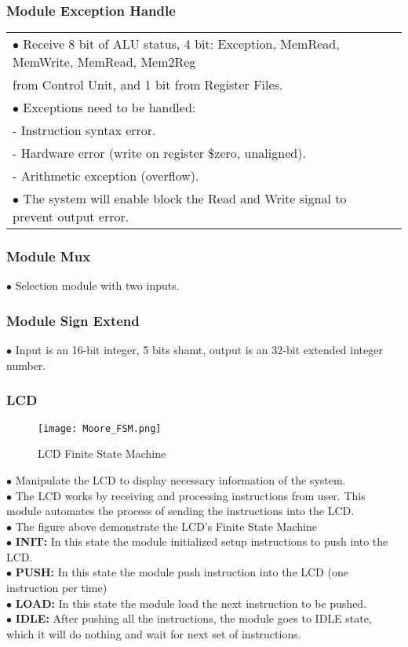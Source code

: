 \documentclass[12pt, a4paper, oneside]{article}
\begin{document}
    \subsubsection{Module Exception Handle}
    \begin{tabular}{ll}
    	$\bullet$ Receive 8 bit of ALU status, 4 bit: Exception, MemRead, MemWrite, MemRead, Mem2Reg & \\ from Control Unit, and 1 bit from Register Files.  & \\
    	$\bullet$ Exceptions need to be handled:& \\ 
    	\quad \quad- Instruction syntax error. &\\
    	\quad \quad- Hardware error (write on register \$zero, unaligned). &\\
    	\quad \quad- Arithmetic exception (overflow). &\\
    	$\bullet$ The system will enable  block the Read and Write signal to prevent output error.&
    \end{tabular}

	\subsubsection{Module Mux}
	$\bullet$ Selection module with two inputs.
	\subsubsection{Module Sign Extend}
	$\bullet$ Input is an 16-bit integer, 5 bits shamt, output is an 32-bit extended integer number.
    
	\subsubsection{LCD}
	\begin{figure}[H]
		\texttt{[image: Moore\_FSM.png]}
		\caption{LCD Finite State Machine}
		\label{fig:LCD}
	\end{figure}
	$\bullet$ Manipulate the LCD to display necessary information of the system. \\
	$\bullet$ The LCD works by receiving and processing instructions from user. This module automates the process of sending the instructions into the LCD. \\
	$\bullet$ The figure above demonstrate the LCD's Finite State Machine \\
	\indent	$\bullet$ \textbf{INIT:} In this state the module initialized setup instructions to push into the LCD. \\
	\indent	$\bullet$ \textbf{PUSH:} In this state the module push instruction into the LCD (one instruction per time) \\ 
	\indent	$\bullet$ \textbf{LOAD:} In this state the module load the next instruction to be pushed. \\
	\indent	$\bullet$ \textbf{IDLE:} After pushing all the instructions, the module goes to IDLE state, which it will do nothing and wait for next set of instructions. \\
	
\end{document}
